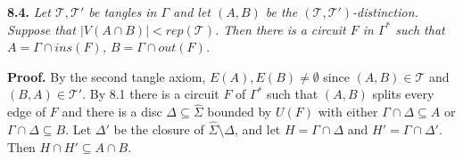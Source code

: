 \textbf{8.4.} \textit{Let $\mathscr{T}, \mathscr{T}'$ be tangles in $\Gamma$ and let $(A, B)$ be the $(\mathscr{T}, \mathscr{T}')$-distinction. Suppose that $|V(A \cap B)| < rep(\mathscr{T})$. Then there is a circuit $F$ in $\Gamma^*$ such that $A = \Gamma \cap ins(F)$, $B = \Gamma \cap out(F)$.}

\textbf{Proof.} By the second tangle axiom, $E(A), E(B) \ne \emptyset$ since $(A, B) \in \mathscr{T}$ and $(B, A) \in \mathscr{T}'$. By 8.1 there is a circuit $F$ of $\Gamma^*$ such that $(A, B)$ splits every edge of $F$ and there is a disc $\Delta \subseteq \hat{\Sigma}$ bounded by $U(F)$ with either $\Gamma \cap \Delta \subseteq A$ or $\Gamma \cap \Delta \subseteq B$. Let $\Delta'$ be the closure of $\hat{\Sigma} \setminus \Delta$, and let $H = \Gamma \cap \Delta$ and $H' = \Gamma \cap \Delta'$. Then $H \cap H' \subseteq A \cap B$.
